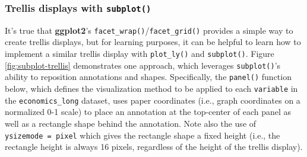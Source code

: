 \documentclass[
  12pt,
]{krantz}
\begin{document}
\hypertarget{trellis-displays-subplot}{%
\subsubsection{\texorpdfstring{Trellis displays with \texttt{subplot()}}{Trellis displays with subplot()}}\label{trellis-displays-subplot}}

It's true that \textbf{ggplot2}'s \texttt{facet\_wrap()}/\texttt{facet\_grid()} provides a simple way to create trellis displays, but for learning purposes, it can be helpful to learn how to implement a similar trellis display with \texttt{plot\_ly()} and \texttt{subplot()}. Figure \ref{fig:subplot-trellis} demonstrates one approach, which leverages \texttt{subplot()}'s ability to reposition annotations and shapes. Specifically, the \texttt{panel()} function below, which defines the visualization method to be applied to each \texttt{variable} in the \texttt{economics\_long} dataset, uses paper coordinates (i.e., graph coordinates on a normalized 0-1 scale) to place an annotation at the top-center of each panel as well as a rectangle shape behind the annotation. Note also the use of \texttt{ysizemode\ =\ \textquotesingle{}pixel\textquotesingle{}} which gives the rectangle shape a fixed height (i.e., the rectangle height is always 16 pixels, regardless of the height of the trellis display).
\end{document}
